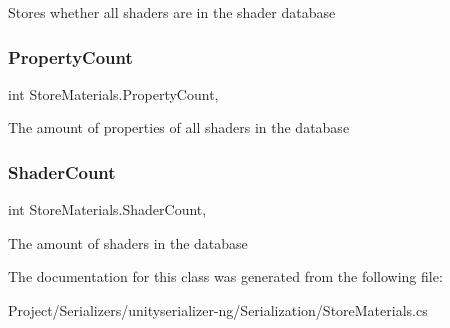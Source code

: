 Stores whether all shaders are in the shader database 

\mbox{\label{class_store_materials_af633ae56d181630940693225d9da628a}} 
\subsubsection{\texorpdfstring{Property\+Count}{PropertyCount}}
{\footnotesize\ttfamily int Store\+Materials.\+Property\+Count\hspace{0.3cm}{\ttfamily [static]}, {\ttfamily [get]}}



The amount of properties of all shaders in the database 

\mbox{\label{class_store_materials_a7e05152810930b9af575d7ef1293b838}} 
\subsubsection{\texorpdfstring{Shader\+Count}{ShaderCount}}
{\footnotesize\ttfamily int Store\+Materials.\+Shader\+Count\hspace{0.3cm}{\ttfamily [static]}, {\ttfamily [get]}}



The amount of shaders in the database 



The documentation for this class was generated from the following file\+:\begin{DoxyCompactItemize}
\item 
Project/\+Serializers/unityserializer-\/ng/\+Serialization/Store\+Materials.\+cs\end{DoxyCompactItemize}
